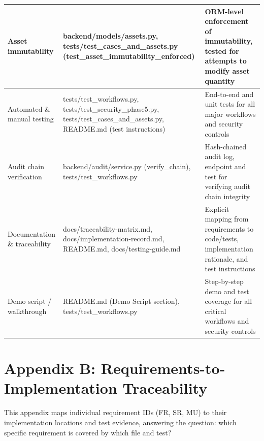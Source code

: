 \documentclass[12pt,a4paper]{report}
\begin{document}
\begin{longtable}{|p{4cm}|p{6cm}|p{5cm}|}
\hline
Asset immutability & backend/models/assets.py, tests/test\_cases\_and\_assets.py (test\_asset\_immutability\_enforced) & ORM-level enforcement of immutability, tested for attempts to modify asset quantity \\
\hline
Automated \& manual testing & tests/test\_workflows.py, tests/test\_security\_phase5.py, tests/test\_cases\_and\_assets.py, README.md (test instructions) & End-to-end and unit tests for all major workflows and security controls \\
\hline
Audit chain verification & backend/audit/service.py (verify\_chain), tests/test\_workflows.py & Hash-chained audit log, endpoint and test for verifying audit chain integrity \\
\hline
Documentation \& traceability & docs/traceability-matrix.md, docs/implementation-record.md, README.md, docs/testing-guide.md & Explicit mapping from requirements to code/tests, implementation rationale, and test instructions \\
\hline
Demo script / walkthrough & README.md (Demo Script section), tests/test\_workflows.py & Step-by-step demo and test coverage for all critical workflows and security controls \\
\hline
\end{longtable}

\chapter*{Appendix B: Requirements-to-Implementation Traceability}

This appendix maps individual requirement IDs (FR, SR, MU) to their implementation locations and test evidence, answering the question: which specific requirement is covered by which file and test?
\end{document}
